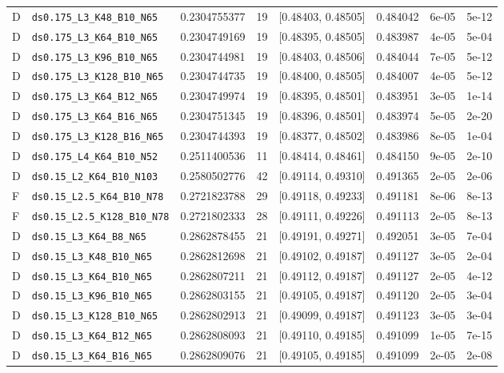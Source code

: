 \begin{longtable}{@{}llrllllr@{}}
D & \texttt{ds0.175\_L3\_K48\_B10\_N65} & 0.2304755377 & 19 & [0.48403, 0.48505] & 0.484042 & 6e-05 & 5e-12\\
D & \texttt{ds0.175\_L3\_K64\_B10\_N65} & 0.2304749169 & 19 & [0.48395, 0.48505] & 0.483987 & 4e-05 & 5e-04\\
D & \texttt{ds0.175\_L3\_K96\_B10\_N65} & 0.2304744981 & 19 & [0.48403, 0.48506] & 0.484044 & 7e-05 & 5e-12\\
D & \texttt{ds0.175\_L3\_K128\_B10\_N65} & 0.2304744735 & 19 & [0.48400, 0.48505] & 0.484007 & 4e-05 & 5e-12\\
D & \texttt{ds0.175\_L3\_K64\_B12\_N65} & 0.2304749974 & 19 & [0.48395, 0.48501] & 0.483951 & 3e-05 & 1e-14\\
D & \texttt{ds0.175\_L3\_K64\_B16\_N65} & 0.2304751345 & 19 & [0.48396, 0.48501] & 0.483974 & 5e-05 & 2e-20\\
D & \texttt{ds0.175\_L3\_K128\_B16\_N65} & 0.2304744393 & 19 & [0.48377, 0.48502] & 0.483986 & 8e-05 & 1e-04\\
D & \texttt{ds0.175\_L4\_K64\_B10\_N52} & 0.2511400536 & 11 & [0.48414, 0.48461] & 0.484150 & 9e-05 & 2e-10\\
D & \texttt{ds0.15\_L2\_K64\_B10\_N103} & 0.2580502776 & 42 & [0.49114, 0.49310] & 0.491365 & 2e-05 & 2e-06\\
F & \texttt{ds0.15\_L2.5\_K64\_B10\_N78} & 0.2721823788 & 29 & [0.49118, 0.49233] & 0.491181 & 8e-06 & 8e-13\\
F & \texttt{ds0.15\_L2.5\_K128\_B10\_N78} & 0.2721802333 & 28 & [0.49111, 0.49226] & 0.491113 & 2e-05 & 8e-13\\
D & \texttt{ds0.15\_L3\_K64\_B8\_N65} & 0.2862878455 & 21 & [0.49191, 0.49271] & 0.492051 & 3e-05 & 7e-04\\
D & \texttt{ds0.15\_L3\_K48\_B10\_N65} & 0.2862812698 & 21 & [0.49102, 0.49187] & 0.491127 & 3e-05 & 2e-04\\
D & \texttt{ds0.15\_L3\_K64\_B10\_N65} & 0.2862807211 & 21 & [0.49112, 0.49187] & 0.491127 & 2e-05 & 4e-12\\
D & \texttt{ds0.15\_L3\_K96\_B10\_N65} & 0.2862803155 & 21 & [0.49105, 0.49187] & 0.491120 & 2e-05 & 3e-04\\
D & \texttt{ds0.15\_L3\_K128\_B10\_N65} & 0.2862802913 & 21 & [0.49099, 0.49187] & 0.491123 & 3e-05 & 3e-04\\
D & \texttt{ds0.15\_L3\_K64\_B12\_N65} & 0.2862808093 & 21 & [0.49110, 0.49185] & 0.491099 & 1e-05 & 7e-15\\
D & \texttt{ds0.15\_L3\_K64\_B16\_N65} & 0.2862809076 & 21 & [0.49105, 0.49185] & 0.491099 & 2e-05 & 2e-08\\

\end{longtable}
